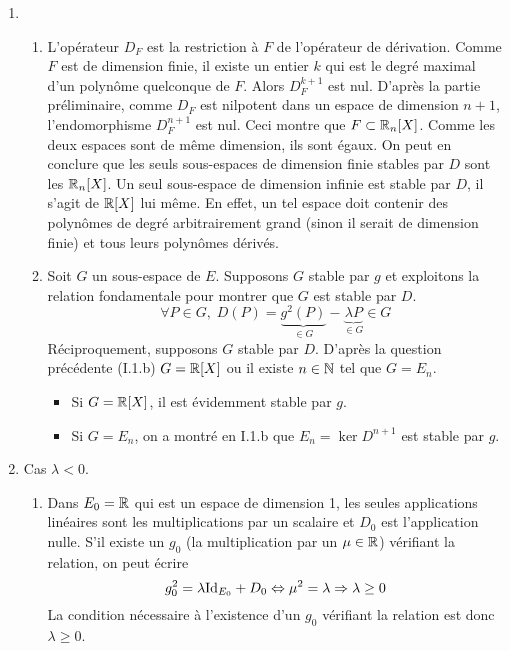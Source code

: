 \begin{enumerate}
 \item
  \begin{enumerate}
 \item L'opérateur $D_F$ est la restriction {\`a} $F$ de l'op{\'e}rateur de d{\'e}rivation. Comme $F$ est de dimension finie, il existe un entier $k$ qui est le degr{\'e} maximal d'un polyn{\^o}me quelconque de $F$. Alors $D_F^{k+1}$ est nul.\newline
D'apr{\`e}s la partie pr{\'e}liminaire, comme $D_F$ est nilpotent dans un espace de dimension $n+1$, l'endomorphisme $D_F^{n+1}$ est nul. Ceci montre que $F\subset \mathbb{R}_n[X]$. Comme les deux espaces sont de m{\^e}me dimension, ils sont {\'e}gaux.\newline
On peut en conclure que les seuls sous-espaces de dimension finie stables par $D$ sont les $\mathbb{R}_n[X]$. \newline
Un seul sous-espace de dimension infinie est stable par $D$, il s'agit de $\mathbb{R}[X]$ lui m{\^e}me. En effet, un tel espace doit contenir des polyn{\^o}mes de degr{\'e} arbitrairement grand (sinon il serait de dimension finie) et tous leurs polynômes d{\'e}riv{\'e}s.

\item Soit $G$ un sous-espace de $E$. Supposons $G$ stable par $g$ et exploitons la relation fondamentale pour montrer que $G$ est stable par $D$.
\begin{displaymath}
\forall P \in G,\; D(P) = \underset{\in G}{\underbrace{g^2(P)}} - \underset{\in G}{\underbrace{\lambda P}} \in G 
\end{displaymath}
Réciproquement, supposons $G$ stable par $D$. D'après la question précédente (I.1.b) $G=\mathbb{R}[X]$ ou il existe $n\in \mathbb{N}$ tel que $G=E_n$.
\begin{itemize}
  \item Si $G=\mathbb{R}[X]$, il est évidemment stable par $g$.
  \item Si $G = E_n$, on a montré en I.1.b que $E_n = \ker D^{n+1}$ est stable par $g$.
\end{itemize}
          \end{enumerate}

  \item Cas $\lambda<0$.

\begin{enumerate}
       \item Dans $E_0=\mathbb{R}$ qui est un espace de dimension 1, les seules applications lin{\'e}aires sont les multiplications par un scalaire et $D_0$ est l'application nulle. S'il existe un $g_0$ (la multiplication par un $\mu\in \mathbb{R}$) vérifiant la relation, on peut écrire
\begin{displaymath}
  g_0^2 = \lambda {\operatorname{Id}}_{E_0} + D_0 \Leftrightarrow \mu^2=\lambda \Rightarrow \lambda \geq 0
\end{displaymath}
La condition nécessaire à l'existence d'un $g_0$ vérifiant la relation est donc $\lambda \geq 0$.


\end{enumerate}
\end{enumerate}
